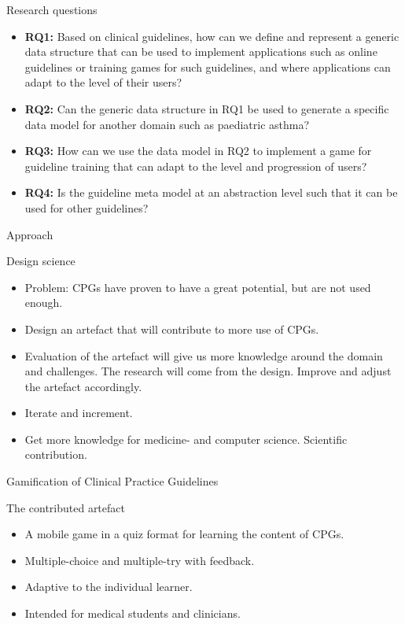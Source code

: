\documentclass{beamer}
\begin{document}
\begin{frame}{Research questions}
\begin{itemize}
	\item \textbf{RQ1:} Based on clinical guidelines, how can we define and represent a generic data structure that can be used to implement applications such as online guidelines or training games for such guidelines, and where applications can adapt to the level of their users?
	\item \textbf{RQ2:} Can the generic data structure in RQ1 be used to generate a specific data model for another domain such as paediatric asthma?
	\item \textbf{RQ3:} How can we use the data model in RQ2 to implement a game for guideline training that can adapt to the level and progression  of users?
	\item \textbf{RQ4:} Is the guideline meta model at an abstraction level such that it can be used for other guidelines? 
\end{itemize}
\end{frame}


\begin{frame}{Approach}
\begin{block}{Design science}
\begin{itemize}
	\item Problem: CPGs have proven to have a great potential, but are not used enough.
	\item Design an artefact that will contribute to more use of CPGs.
	\item Evaluation of the artefact will give us more knowledge around the domain and challenges. The research will come from the design. Improve and adjust the artefact accordingly. 
	\item Iterate and increment.
	\item Get more knowledge for medicine- and computer science. Scientific contribution.
\end{itemize}
\end{block}
\end{frame}

\begin{frame}{Gamification of Clinical Practice Guidelines}
\begin{block}{The contributed artefact}
\begin{itemize}
	\item A mobile game in a quiz format for learning the content of CPGs.
	\item Multiple-choice and multiple-try with feedback.
	\item Adaptive to the individual learner.
	\item Intended for medical students and clinicians.
\end{itemize}
\end{block}
\end{frame}
\end{document}
